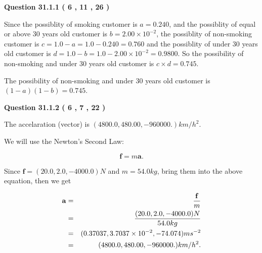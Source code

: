 \documentclass[12pt]{article}
\begin{document}
{\textbf{\Large{Question
31.1.1 
 (           6 ,          11 ,          26 )
}}}
  
  
 
 
\noindent{}

Since the possiblity of  %
smoking customer is $ a =  %
0.240 $,
and the possiblity of  %
equal or above 30 years old customer is $ b =  %
2.00 \times 10^{-2} $,
the possiblity of  %
non-smoking customer is $ c = 1.0 - a = 1.0 -
0.240
=  %
0.760 $ and the possiblity of  %
under 30 years old
customer is $ d = 1.0 - b = 1.0 -  %
2.00 \times 10^{-2} =  %
0.9800  $.
So the possibility of  %
 non-smoking and  %
under 30 years old
customer is $ c \times d =  %
0.745 $.
 
 
 
 
 
\noindent{}

The possibility of  %
 non-smoking and  %
under 30 years old
customer is $ (1-a)(1-b) =  %
0.745 $.
 
 
  
\vspace{0.2in}
  
{\textbf{\Large{Question
31.1.2 
 (           6 ,           7 ,          22 )
}}}
  
  
 
 
\noindent{}
 
 
The accelaration (vector) is
$(
4800.0,
480.00 ,
-960000.
)km/h^2.
$
 
 
 
 
 
 
\noindent{}

We will use the Newton's Second Law:
 
\[
\mathbf{f}=m\mathbf{a}.
\]
 
Since $\mathbf{f}=( %
20.0,  %
2.0,  %
-4000.0 )N$
and $m= %
54.0 kg$, bring them into the above equation, then we get
 
\begin{eqnarray*}
\mathbf{a}&=&\frac{\mathbf{f}}m  \\
&=&\frac{(
20.0 ,
2.0 ,
-4000.0 )N
}{ %
54.0 kg}  \\
&=&(
0.37037 ,
3.7037 \times 10^{-2},
-74.074
)ms^{-2} \\
&=&(
4800.0 ,
480.00 ,
-960000.
)km/h^2.
\end{eqnarray*}
 
\end{document}
